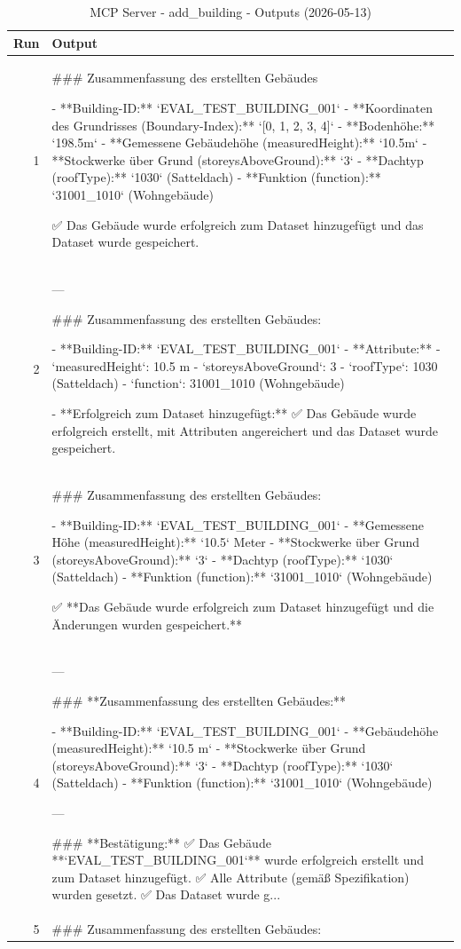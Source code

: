 \documentclass[a4paper,11pt]{article}
\begin{document}
\begin{table}[ht]
\centering
\scriptsize
\caption{MCP Server - add\_building - Outputs (2026-05-13)}
\label{tab:mcp\_add\_building\_outputs\_2026-05-13}
\begin{tabular}{r p{12cm}}
\hline
Run & Output \\
\hline
1 & \#\#\# Zusammenfassung des erstellten Gebäudes

- **Building-ID:** `EVAL\_TEST\_BUILDING\_001`
- **Koordinaten des Grundrisses (Boundary-Index):** `[0, 1, 2, 3, 4]`
- **Bodenhöhe:** `198.5m`
- **Gemessene Gebäudehöhe (measuredHeight):** `10.5m`
- **Stockwerke über Grund (storeysAboveGround):** `3`
- **Dachtyp (roofType):** `1030` (Satteldach)
- **Funktion (function):** `31001\_1010` (Wohngebäude)

✅ Das Gebäude wurde erfolgreich zum Dataset hinzugefügt und das Dataset wurde gespeichert. \\
2 & ---

\#\#\# Zusammenfassung des erstellten Gebäudes:

- **Building-ID:** `EVAL\_TEST\_BUILDING\_001`
- **Attribute:**
  - `measuredHeight`: 10.5 m
  - `storeysAboveGround`: 3
  - `roofType`: 1030 (Satteldach)
  - `function`: 31001\_1010 (Wohngebäude)

- **Erfolgreich zum Dataset hinzugefügt:** ✅
  Das Gebäude wurde erfolgreich erstellt, mit Attributen angereichert und das Dataset wurde gespeichert. \\
3 & \#\#\# Zusammenfassung des erstellten Gebäudes:

- **Building-ID:** `EVAL\_TEST\_BUILDING\_001`
- **Gemessene Höhe (measuredHeight):** `10.5` Meter
- **Stockwerke über Grund (storeysAboveGround):** `3`
- **Dachtyp (roofType):** `1030` (Satteldach)
- **Funktion (function):** `31001\_1010` (Wohngebäude)

✅ **Das Gebäude wurde erfolgreich zum Dataset hinzugefügt und die Änderungen wurden gespeichert.** \\
4 & ---

\#\#\# **Zusammenfassung des erstellten Gebäudes:**

- **Building-ID:** `EVAL\_TEST\_BUILDING\_001`
- **Gebäudehöhe (measuredHeight):** `10.5 m`
- **Stockwerke über Grund (storeysAboveGround):** `3`
- **Dachtyp (roofType):** `1030` (Satteldach)
- **Funktion (function):** `31001\_1010` (Wohngebäude)

---

\#\#\# **Bestätigung:**
✅ Das Gebäude **`EVAL\_TEST\_BUILDING\_001`** wurde erfolgreich erstellt und zum Dataset hinzugefügt.
✅ Alle Attribute (gemäß Spezifikation) wurden gesetzt.
✅ Das Dataset wurde g... \\
5 & \#\#\# Zusammenfassung des erstellten Gebäudes:


\end{tabular}
\end{table}
\end{document}
